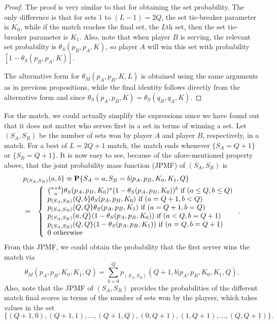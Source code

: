 \documentclass[11pt]{article}
\theoremstyle{plain}
\theoremstyle{definition}
\renewcommand{\Pr}{\mathbf{P}}
\begin{document}
\begin{proof}
 The proof is very similar to that for obtaining the set probability. The only difference is that for sets $1$ to $(L-1) = 2Q$, the set tie-breaker parameter is $K_0$, while if the match reaches the final set, the $L$th set, then the set tie-breaker parameter is $K_1$. Also, note that when player $B$ is serving, the relevant set probability is  $\theta_S(p_B,p_A,K)$, so player $A$ will win this set with probability $[1 - \theta_S(p_B,p_A,K)]$.

 The alternative form for $\theta_M(p_A,p_B,K,L)$ is obtained using the same arguments as in previous propositions, while the final identity follows directly from the alternative form and since $\theta_S(p_A,p_B,K) = \theta_S(q_B,q_A,K)$.
\end{proof}

For the match, we could actually simplify the expressions since we have found out that it does not matter who serves first in a set in terms of winning a set. Let $(S_A,S_B)$ be the number of sets won by player $A$ and player $B$, respectively, in a match. For a best of $L = 2Q+1$ match, the match ends whenever $\{S_A = Q+1\}$ or $\{S_B = Q+1\}$. It is now easy to see, because of the afore-mentioned property above, that the joint probability mass function (JPMF) of $(S_A,S_B)$ is
%
\begin{eqnarray*}
\lefteqn{   p_{(S_A,S_B)}(a,b\} \equiv \Pr\{S_A=a,S_B=b|p_A,p_B,K_0,K_1,Q\} } \\ & = &
    \left\{
    \begin{array}{lll}
    {{a+b} \choose a} \theta_S(p_A,p_B,K_0)^a (1 - \theta_S(p_A,p_B,K_0))^b \ \mbox{if}\ (a \le Q, b \le Q) \\
    p_{(S_A,S_B)}(Q,b\} \theta_S(p_A,p_B,K_0) \ \mbox{if}\ (a = Q+1, b < Q) \\
    p_{(S_A,S_B)}(Q,Q\} \theta_S(p_A,p_B,K_1) \ \mbox{if}\ (a = Q+1, b = Q) \\
        p_{(S_A,S_B)}(a,Q\} (1-\theta_S(p_A,p_B,K_0)) \ \mbox{if}\ (a < Q, b = Q+1) \\
    p_{(S_A,S_B)}(Q,Q\} (1-\theta_S(p_A,p_B,K_1)) \ \mbox{if}\ (a = Q, b = Q+1) \\
0 \ \mbox{otherwise}
    \end{array}
    \right..
\end{eqnarray*}
%
From this JPMF, we could obtain the probability that the first server wins the match via
%
$$\theta_M(p_A,p_B,K_0,K_1,Q) = \sum_{b=0}^Q p_{(S_A,S_B)}(Q+1,b|p_A,p_B,K_0,K_1,Q).$$
%
Also, note that the JPMF of $(S_A,S_B)$ provides the probabilities of the different match final scores in terms of the number of sets won by the players, which takes values in the set 
%
$$\{(Q+1,0),(Q+1,1),\ldots,(Q+1,Q),(0,Q+1),(1,Q+1),\ldots,(Q,Q+1)\}.$$
%
\end{document}
